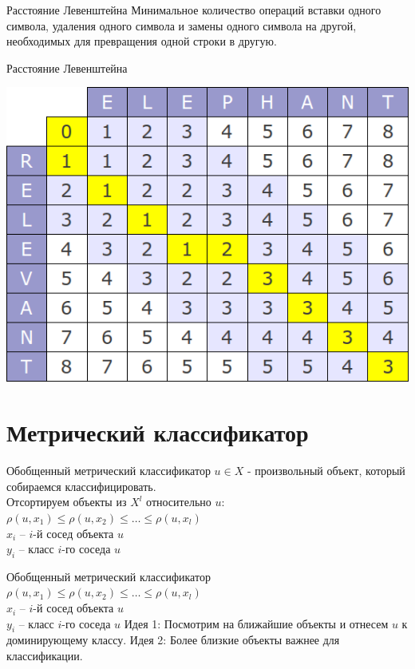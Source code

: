 \documentclass[10pt]{beamer}
\begin{document}
{
\begin{frame}{Расстояние Левенштейна}
	Минимальное количество операций вставки одного символа, удаления одного символа и замены одного символа на другой, необходимых для превращения одной строки в другую.
\end{frame}
}

\begin{frame}{Расстояние Левенштейна}
	\begin{center}
	  \includegraphics[width=\textwidth]{images/levenshtein}
	\end{center}
\end{frame}

\section{Метрический классификатор}

\begin{frame}{Обобщенный метрический классификатор}
	$u \in X$ - произвольный объект, который собираемся классифицировать.\\
	\bigbreak
	Отсортируем объекты из $X^l$ относительно $u$:
	${\rho(u, x_1) \leq \rho(u, x_2) \leq \dots \leq \rho(u, x_l)}$\\
	\bigbreak
	${x_i}$ -- $i$-й сосед объекта $u$\\
	${y_i}$ -- класс $i$-го соседа $u$
\end{frame}

\begin{frame}{Обобщенный метрический классификатор}
	${\rho(u, x_1) \leq \rho(u, x_2) \leq \dots \leq \rho(u, x_l)}$\\
	\bigbreak
	${x_i}$ -- $i$-й сосед объекта $u$\\
	${y_i}$ -- класс $i$-го соседа $u$
  \bigbreak
  \alert{Идея 1}: Посмотрим на ближайшие объекты и отнесем $u$ к доминирующему классу. 
  \bigbreak
  \alert{Идея 2}: Более близкие объекты важнее для классификации.
\end{frame}
\end{document}
